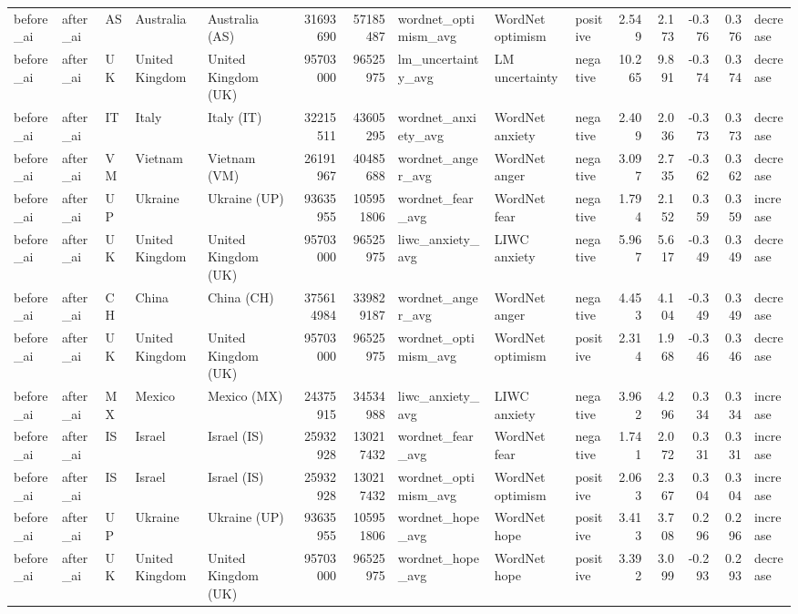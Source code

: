 \begin{tabular}{lllllrrlllrrrrl}
before\_ai & after\_ai & AS & Australia & Australia (AS) & 31693690 & 57185487 & wordnet\_optimism\_avg & WordNet optimism & positive & 2.549 & 2.173 & -0.376 & 0.376 & decrease \\
before\_ai & after\_ai & UK & United Kingdom & United Kingdom (UK) & 95703000 & 96525975 & lm\_uncertainty\_avg & LM uncertainty & negative & 10.265 & 9.891 & -0.374 & 0.374 & decrease \\
before\_ai & after\_ai & IT & Italy & Italy (IT) & 32215511 & 43605295 & wordnet\_anxiety\_avg & WordNet anxiety & negative & 2.409 & 2.036 & -0.373 & 0.373 & decrease \\
before\_ai & after\_ai & VM & Vietnam & Vietnam (VM) & 26191967 & 40485688 & wordnet\_anger\_avg & WordNet anger & negative & 3.097 & 2.735 & -0.362 & 0.362 & decrease \\
before\_ai & after\_ai & UP & Ukraine & Ukraine (UP) & 93635955 & 105951806 & wordnet\_fear\_avg & WordNet fear & negative & 1.794 & 2.152 & 0.359 & 0.359 & increase \\
before\_ai & after\_ai & UK & United Kingdom & United Kingdom (UK) & 95703000 & 96525975 & liwc\_anxiety\_avg & LIWC anxiety & negative & 5.967 & 5.617 & -0.349 & 0.349 & decrease \\
before\_ai & after\_ai & CH & China & China (CH) & 375614984 & 339829187 & wordnet\_anger\_avg & WordNet anger & negative & 4.453 & 4.104 & -0.349 & 0.349 & decrease \\
before\_ai & after\_ai & UK & United Kingdom & United Kingdom (UK) & 95703000 & 96525975 & wordnet\_optimism\_avg & WordNet optimism & positive & 2.314 & 1.968 & -0.346 & 0.346 & decrease \\
before\_ai & after\_ai & MX & Mexico & Mexico (MX) & 24375915 & 34534988 & liwc\_anxiety\_avg & LIWC anxiety & negative & 3.962 & 4.296 & 0.334 & 0.334 & increase \\
before\_ai & after\_ai & IS & Israel & Israel (IS) & 25932928 & 130217432 & wordnet\_fear\_avg & WordNet fear & negative & 1.741 & 2.072 & 0.331 & 0.331 & increase \\
before\_ai & after\_ai & IS & Israel & Israel (IS) & 25932928 & 130217432 & wordnet\_optimism\_avg & WordNet optimism & positive & 2.063 & 2.367 & 0.304 & 0.304 & increase \\
before\_ai & after\_ai & UP & Ukraine & Ukraine (UP) & 93635955 & 105951806 & wordnet\_hope\_avg & WordNet hope & positive & 3.413 & 3.708 & 0.296 & 0.296 & increase \\
before\_ai & after\_ai & UK & United Kingdom & United Kingdom (UK) & 95703000 & 96525975 & wordnet\_hope\_avg & WordNet hope & positive & 3.392 & 3.099 & -0.293 & 0.293 & decrease \\

\end{tabular}
